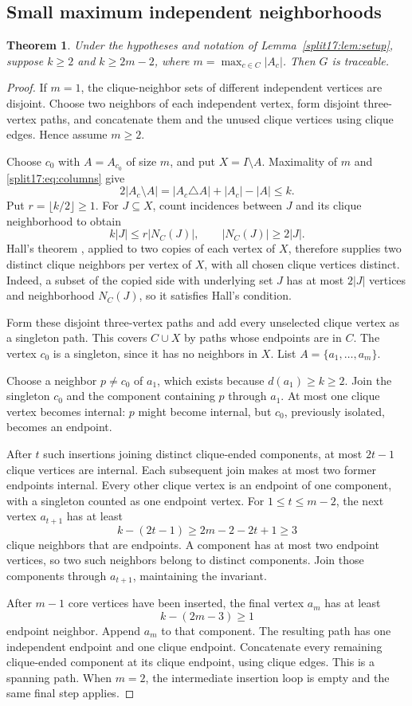 \documentclass[11pt,a4paper]{article}
\newtheorem{theorem}{Theorem}[section]
\theoremstyle{definition}\newtheorem{definition}[theorem]{Definition}
\theoremstyle{remark}\newtheorem{remark}[theorem]{Remark}
\begin{document}
\subsection{Small maximum independent neighborhoods}\label{split17:sec:small-m}
\begin{theorem}\label{split17:thm:small-m}
Under the hypotheses and notation of Lemma~\ref{split17:lem:setup}, suppose
$k\ge2$ and $k\ge2m-2$, where $m=\max_{c\in C}|A_c|$. Then $G$ is traceable.
\end{theorem}
\begin{proof}
If $m=1$, the clique-neighbor sets of different independent vertices are
disjoint. Choose two neighbors of each independent vertex, form disjoint
three-vertex paths, and concatenate them and the unused clique vertices
using clique edges. Hence assume $m\ge2$.

Choose $c_0$ with $A=A_{c_0}$ of size $m$, and put $X=I\setminus A$.
Maximality of $m$ and \eqref{split17:eq:columns} give
\[
 2|A_c\setminus A|=|A_c\triangle A|+|A_c|-|A|\le k.
\]
Put $r=\lfloor k/2\rfloor\ge1$. For $J\subseteq X$, count incidences
between $J$ and its clique neighborhood to obtain
\[
 k|J|\le r|N_C(J)|,\qquad |N_C(J)|\ge2|J|.
\]
Hall's theorem \cite{src:hall}, applied to two copies of each vertex of $X$,
therefore supplies two distinct clique neighbors per vertex of $X$, with
all chosen clique vertices distinct. Indeed, a subset of the copied side
with underlying set $J$ has at most $2|J|$ vertices and neighborhood
$N_C(J)$, so it satisfies Hall's condition.

Form these disjoint three-vertex paths and add every unselected clique
vertex as a singleton path. This covers $C\cup X$ by paths whose endpoints
are in $C$. The vertex $c_0$ is a singleton, since it has no neighbors in
$X$. List $A=\{a_1,\ldots,a_m\}$.

Choose a neighbor $p\ne c_0$ of $a_1$, which exists because $d(a_1)\ge k\ge2$.
Join the singleton $c_0$ and the component containing $p$ through $a_1$.
At most one clique vertex becomes internal: $p$ might become internal,
but $c_0$, previously isolated, becomes an endpoint.

After $t$ such insertions joining distinct clique-ended components,
at most $2t-1$ clique vertices are internal. Each subsequent join makes
at most two former endpoints internal. Every other clique vertex is an
endpoint of one component, with a singleton counted as one endpoint vertex.
For $1\le t\le m-2$, the next vertex $a_{t+1}$ has at least
\[
 k-(2t-1)\ge2m-2-2t+1\ge3
\]
clique neighbors that are endpoints. A component has at most two endpoint
vertices, so two such neighbors belong to distinct components. Join those
components through $a_{t+1}$, maintaining the invariant.

After $m-1$ core vertices have been inserted, the final vertex $a_m$ has
at least
\[
 k-(2m-3)\ge1
\]
endpoint neighbor. Append $a_m$ to that component. The resulting path has
one independent endpoint and one clique endpoint. Concatenate every
remaining clique-ended component at its clique endpoint, using clique
edges. This is a spanning path. When $m=2$, the intermediate insertion
loop is empty and the same final step applies.
\end{proof}
\end{document}

